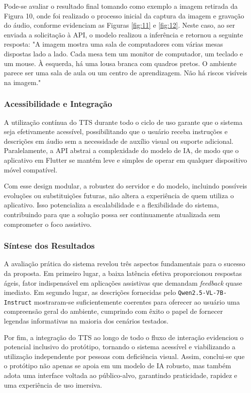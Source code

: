 Pode-se avaliar o resultado final tomando como exemplo a imagem retirada da Figura 10, onde foi realizado o processo inicial da captura da imagem e gravação do áudio, conforme evidenciam as Figuras \ref{fig:11} e \ref{fig:12}. Neste caso, ao ser enviada a solicitação à API, o modelo realizou a inferência e retornou a seguinte resposta: "A imagem mostra uma sala de computadores com várias mesas dispostas lado a lado. Cada mesa tem um monitor de computador, um teclado e um mouse. À esquerda, há uma lousa branca com quadros pretos. O ambiente parece ser uma sala de aula ou um centro de aprendizagem. Não há riscos visíveis na imagem."

\subsubsection{Acessibilidade e Integração}

A utilização contínua do TTS durante todo o ciclo de uso garante que o sistema seja efetivamente acessível, possibilitando que o usuário receba instruções e descrições em áudio sem a necessidade de auxílio visual ou suporte adicional. Paralelamente, a API abstrai a complexidade do modelo de IA, de modo que o aplicativo em Flutter se mantém leve e simples de operar em qualquer dispositivo móvel compatível.

Com esse design modular, a robustez do servidor e do modelo, incluindo possíveis evoluções ou substituições futuras, não altera a experiência de quem utiliza o aplicativo. Isso potencializa a escalabilidade e a flexibilidade do sistema, contribuindo para que a solução possa ser continuamente atualizada sem comprometer o foco assistivo.

\subsubsection{Síntese dos Resultados}

A avaliação prática do sistema revelou três aspectos fundamentais para o sucesso da proposta. Em primeiro lugar, a baixa latência efetiva proporcionou respostas ágeis, fator indispensável em aplicações assistivas que demandam \textit{feedback} quase imediato. Em segundo lugar, as descrições fornecidas pelo \lstinline{Qwen2.5-VL-7B-Instruct} mostraram-se suficientemente coerentes para oferecer ao usuário uma compreensão geral do ambiente, cumprindo com êxito o papel de fornecer legendas informativas na maioria dos cenários testados.

Por fim, a integração do TTS ao longo de todo o fluxo de interação evidenciou o potencial inclusivo do protótipo, tornando o sistema acessível e viabilizando a utilização independente por pessoas com deficiência visual. Assim, conclui-se que o protótipo não apenas se apoia em um modelo de IA robusto, mas também adota uma interface voltada ao público-alvo, garantindo praticidade, rapidez e uma experiência de uso imersiva.

